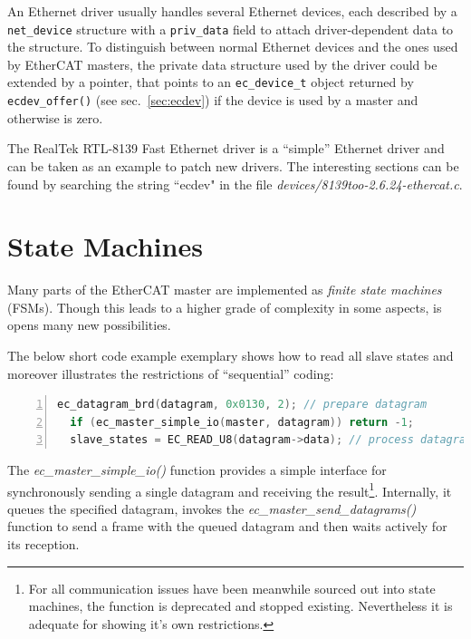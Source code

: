 \documentclass[a4paper,12pt,BCOR6mm,bibtotoc,idxtotoc]{scrbook}
\begin{document}
An Ethernet driver usually handles several Ethernet devices, each described by
a \lstinline+net_device+ structure with a \lstinline+priv_data+ field to
attach driver-dependent data to the structure. To distinguish between normal
Ethernet devices and the ones used by EtherCAT masters, the private data
structure used by the driver could be extended by a pointer, that points to an
\lstinline+ec_device_t+ object returned by \lstinline+ecdev_offer()+ (see
sec.~\ref{sec:ecdev}) if the device is used by a master and otherwise is zero.

The RealTek RTL-8139 Fast Ethernet driver is a ``simple'' Ethernet driver and
can be taken as an example to patch new drivers. The interesting sections can
be found by searching the string ``ecdev" in the file
\textit{devices/8139too-2.6.24-ethercat.c}.


\chapter{State Machines}
\label{sec:fsm}

Many parts of the EtherCAT master are implemented as \textit{finite state
machines} (FSMs). Though this leads
to a higher grade of complexity in some aspects, is opens many new
possibilities.

The below short code example exemplary shows how to read all slave
states and moreover illustrates the restrictions of ``sequential''
coding:

\begin{lstlisting}[gobble=2,language=C,numbers=left]
  ec_datagram_brd(datagram, 0x0130, 2); // prepare datagram
  if (ec_master_simple_io(master, datagram)) return -1;
  slave_states = EC_READ_U8(datagram->data); // process datagram
\end{lstlisting}

The \textit{ec\_master\_simple\_io()} function provides a simple interface for
synchronously sending a single datagram and receiving the result\footnote{For
all communication issues have been meanwhile sourced out into state machines,
the function is deprecated and stopped existing. Nevertheless it is adequate
for showing it's own restrictions.}. Internally, it queues the specified
datagram, invokes the \textit{ec\_master\_send\_datagrams()} function to send
a frame with the queued datagram and then waits actively for its reception.
\end{document}
